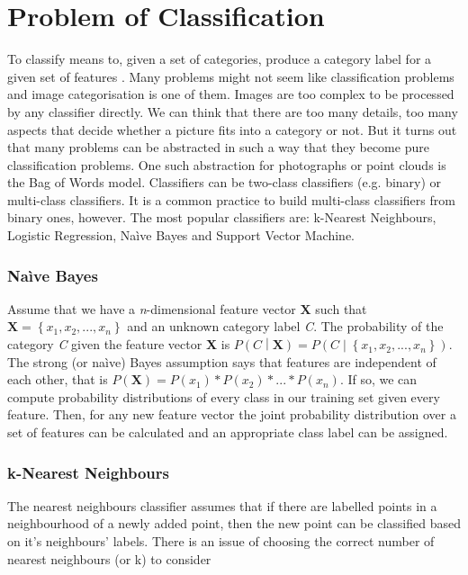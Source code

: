 \section{Problem of Classification}

	
	To classify means to, given a set of categories, produce a category label for a given set of features \cite{ponce2011cv}. Many problems might not seem like classification problems and image categorisation is one of them. Images are too complex to be processed by any classifier directly. We can think that there are too many details, too many aspects that decide whether a picture fits into a category or not. But it turns out that many problems can be abstracted in such a way that they become pure classification problems. One such abstraction for photographs or point clouds is the Bag of Words model. Classifiers can be two-class classifiers (e.g. binary) or multi-class classifiers. It is a common practice to build multi-class classifiers from binary ones, however. The most popular classifiers are: k-Nearest Neighbours, Logistic Regression, Na\`ive Bayes and Support Vector Machine.
	
	\subsubsection{Na\`ive Bayes}
	Assume that we have a \textit{n}-dimensional feature vector $\mathbf{X}$ such that $\mathbf{X} = \left\{x_1, x_2, ... , x_\mathit{n}\right\}$ and an unknown category label \textit{C}. The probability of the category \textit{C} given the feature vector \textbf{X} is $P\left(\mathit{C}\middle|\mathbf{X}\right) = P\left(\mathit{C}\middle|\left\{x_1, x_2, ..., x_\mathit{n}\right\}\right)$. The strong (or na\`ive) Bayes assumption says that features are independent of each other, that is $P(\mathbf{X}) = P(x_1)*P(x_2)*...*P(x_\mathit{n})$. If so, we can compute probability distributions of every class in our training set given every feature. Then, for any new feature vector the joint probability distribution over a set of features can be calculated and an appropriate class label can be assigned.
	
	\subsubsection{k-Nearest Neighbours}
	The nearest neighbours classifier assumes that if there are labelled points in a neighbourhood of a newly added point, then the new point can be classified based on it's neighbours' labels. There is an issue of choosing the correct number of nearest neighbours (or k) to consider
	
